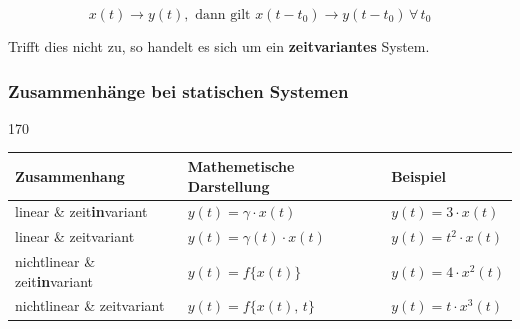 $$ \boxed{ x(t) \to y(t), \text{ dann gilt } x(t- t_0) \to y(t- t_0) \, \forall \, t_0  } $$

Trifft dies nicht zu, so handelt es sich um ein \textbf{zeitvariantes} System.


\subsubsection{Zusammenhänge bei statischen Systemen}{170}

\begin{center}
    \begin{tabular}{lll}
        \toprule
        \textbf{Zusammenhang}                   & \textbf{Mathemetische Darstellung}        & \textbf{Beispiel}         \\
        \midrule
        linear \& zeit\textbf{in}variant        & $y(t) = \gamma \cdot x(t)$                & $y(t) = 3 \cdot x(t)$     \\
        \midrule
        linear \& zeitvariant                   & $y(t) = \gamma(t) \cdot x(t)$             & $y(t) = t^2 \cdot x(t)$   \\
        \midrule
        nichtlinear \& zeit\textbf{in}variant   & $y(t) = f\{x(t)\}$                        & $y(t) = 4 \cdot x^2(t)$   \\
        \midrule
        nichtlinear \& zeitvariant              & $y(t) = f\{x(t), \, t\}$                  & $y(t) = t \cdot x^3(t)$   \\
        \bottomrule
    \end{tabular}
\end{center}

